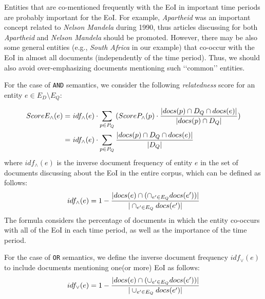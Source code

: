 \documentclass{article}
\newcommand{\q}[1]{\lq\lq{}{}#1\rq\rq{}{}}
\begin{document}
Entities that are co-mentioned frequently with the EoI
in important time periods are probably important for the EoI.
For example, {\em Apartheid} was an important concept
related to {\em Nelson Mandela} %
during 1990,
thus articles discussing for both {\em Apartheid} and {\em Nelson Mandela} %
should be promoted.
However, there may be also some general entities (e.g., {\em South Africa} in our example)
that co-occur with the EoI in almost all documents (independently of the time period).
Thus, we should also avoid over-emphasizing documents mentioning such \q{common} entities.

For the case of {\tt AND} semantics,
we consider the following {\em relatedness} score
for an entity $e \in E_D \setminus E_Q$:

\begin{equation}
\begin{split}
\small
ScoreE_\wedge(e) = & ~ idf_\wedge(e) \cdot \sum_{p \in P_Q}{(ScoreP_\wedge(p) \cdot \frac{|docs(p) \cap D_Q \cap docs(e)|}{|docs(p) \cap D_Q|})}\\
= & ~ idf_\wedge(e) \cdot \sum_{p \in P_Q}{\frac{|docs(p) \cap D_Q \cap docs(e)|}{|D_Q|}}
\end{split}
\end{equation}
where $idf_\wedge(e)$ is the inverse document frequency
of entity $e$ in the set of documents discussing about the EoI in the entire corpus,
which can be defined as follows:
\begin{equation}
\label{frml:idf_and}
\small
idf_\wedge(e) = 1 - \frac{|docs(e) \cap (\cap_{e' \in E_Q}{docs(e')})|}{|\cap_{e' \in E_Q}{docs(e')}|}
\end{equation}
The formula considers the percentage of
documents in which the entity
co-occurs with all of the EoI in each time period, as well as the importance of the time period.

For the case of {\tt OR} semantics, we define the inverse document frequency $idf_\vee(e)$
to include documents mentioning one(or more) EoI as follows:
\begin{equation}
\label{frml:idf_or}
\small
idf_\vee(e) = 1 - \frac{|docs(e) \cap (\cup_{e' \in E_Q}{docs(e')})|}{|\cup_{e' \in E_Q}{docs(e')}|}
\end{equation}
\end{document}
